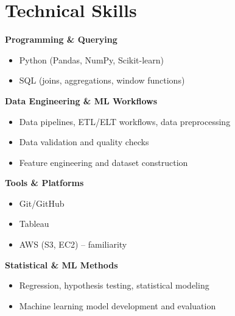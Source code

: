 \documentclass[10pt, letterpaper]{article}
\begin{document}

\section*{Technical Skills}

\textbf{Programming \& Querying}
\begin{itemize}
    \item Python (Pandas, NumPy, Scikit-learn)
    \item SQL (joins, aggregations, window functions)
\end{itemize}

\textbf{Data Engineering \& ML Workflows}
\begin{itemize}
    \item Data pipelines, ETL/ELT workflows, data preprocessing
    \item Data validation and quality checks
    \item Feature engineering and dataset construction
\end{itemize}

\textbf{Tools \& Platforms}
\begin{itemize}
    \item Git/GitHub
    \item Tableau
    \item AWS (S3, EC2) -- familiarity
\end{itemize}

\textbf{Statistical \& ML Methods}
\begin{itemize}
    \item Regression, hypothesis testing, statistical modeling
    \item Machine learning model development and evaluation
\end{itemize}
   
\end{document}
